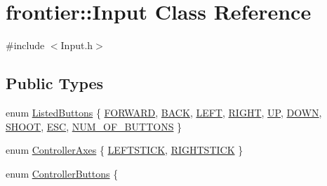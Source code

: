 \hypertarget{classfrontier_1_1_input}{}\section{frontier\+:\+:Input Class Reference}
\label{classfrontier_1_1_input}


{\ttfamily \#include $<$Input.\+h$>$}

\subsection*{Public Types}
\begin{DoxyCompactItemize}
\item 
enum \hyperlink{classfrontier_1_1_input_ada5b6b09af9c827bacee6fbc69015096}{Listed\+Buttons} \{ \newline
\hyperlink{classfrontier_1_1_input_ada5b6b09af9c827bacee6fbc69015096acf85ba7c8b56fe96ae704fcad0835413}{F\+O\+R\+W\+A\+RD}, 
\hyperlink{classfrontier_1_1_input_ada5b6b09af9c827bacee6fbc69015096a854a2566d855b54f71c31b1a80af7f7f}{B\+A\+CK}, 
\hyperlink{classfrontier_1_1_input_ada5b6b09af9c827bacee6fbc69015096a054bf540c4446c6dd0ebfbc47d3b86d6}{L\+E\+FT}, 
\hyperlink{classfrontier_1_1_input_ada5b6b09af9c827bacee6fbc69015096a3f8c1b55a3e0fa5b9e49e013af3aa898}{R\+I\+G\+HT}, 
\newline
\hyperlink{classfrontier_1_1_input_ada5b6b09af9c827bacee6fbc69015096ab29a79dea09fc2efd9195b5bd9f9cb59}{UP}, 
\hyperlink{classfrontier_1_1_input_ada5b6b09af9c827bacee6fbc69015096ae77fe1ca5149c538bcbe2d3220e065d5}{D\+O\+WN}, 
\hyperlink{classfrontier_1_1_input_ada5b6b09af9c827bacee6fbc69015096ac8790ceaafc8368972a3d7129c0d08e9}{S\+H\+O\+OT}, 
\hyperlink{classfrontier_1_1_input_ada5b6b09af9c827bacee6fbc69015096aa10db7305f9845cff63ba11af6092c0c}{E\+SC}, 
\newline
\hyperlink{classfrontier_1_1_input_ada5b6b09af9c827bacee6fbc69015096a0bf7f4342c9ece5810241620ccf09f45}{N\+U\+M\+\_\+\+O\+F\+\_\+\+B\+U\+T\+T\+O\+NS}
 \}
\item 
enum \hyperlink{classfrontier_1_1_input_aa34e103eba0f13faf437863692310859}{Controller\+Axes} \{ \hyperlink{classfrontier_1_1_input_aa34e103eba0f13faf437863692310859a7d1d161914b2562dfd89a471e7b8e62c}{L\+E\+F\+T\+S\+T\+I\+CK}, 
\hyperlink{classfrontier_1_1_input_aa34e103eba0f13faf437863692310859a14768741d70c19c7ae2e8dce9769bd1f}{R\+I\+G\+H\+T\+S\+T\+I\+CK}
 \}
\item 
enum \hyperlink{classfrontier_1_1_input_affa0331a173268233d6630184a105bb6}{Controller\+Buttons} \{ \newline

\end{DoxyCompactItemize}
